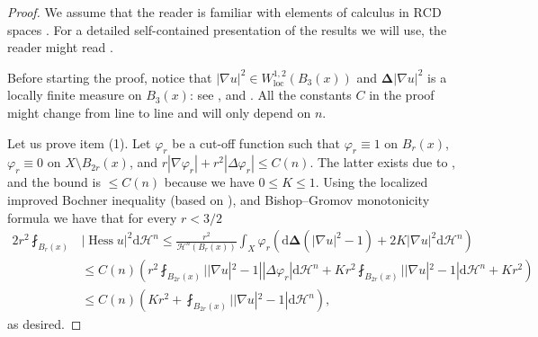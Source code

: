 \documentclass[12pt,a4paper,reqno]{amsart}
\renewcommand{\leq}{\leqslant}
\renewcommand{\d}{\ensuremath{\mathrm d}}
\newcommand{\Hess}{\operatorname{Hess}}
\begin{document}
\begin{proof}
 We assume that the reader is familiar with elements of calculus in $\mathrm{RCD}$ spaces \cite{GigliNDG}. For a detailed self-contained presentation of the results we will use, the reader might read \cite[Section 2]{GigliViolo}.

 Before starting the proof, notice that $|\nabla u|^2\in W^{1,2}_{\mathrm{loc}}(B_{3}(x))$ and $\mathbf{\Delta}|\nabla u|^2$ is a locally finite measure on $B_3(x)$: see \cite[Section 2.2.1]{GigliViolo}, and \cite[Corollary 3.3.9]{GigliNDG}. All the constants $C$ in the proof might change from line to line and will only depend on $n$.
 
 Let us prove item (1). Let $\varphi_r$ be a cut-off function such that $\varphi_r\equiv 1$ on $B_r(x)$, $\varphi_r\equiv 0$ on $X\setminus B_{2r}(x)$, and $r|\nabla\varphi_r|+r^2|\Delta\varphi_r|\leq C(n)$. The latter exists due to \cite[Lemma 3.1]{MondinoNaber}, and the bound is $\leq C(n)$ because we have $0\leq K\leq 1$. Using the localized improved Bochner inequality \cite[Proposition~2.14]{GigliViolo} (based on \cite[Theorem 3.3]{Bangxian}), and Bishop--Gromov monotonicity formula we have that for every $r<3/2$
    \[
    \begin{aligned}
    2r^2\fint_{B_r(x)}&|\Hess u|^2\d\mathcal{H}^n\leq \frac{r^2}{\mathcal{H}^n(B_r(x))}\int_{X} \varphi_r\left(\d\mathbf{\Delta}(|\nabla u|^2-1) +2K|\nabla u|^2\d\mathcal{H}^n\right)  \\
    &\leq C(n)\left(r^2\fint_{B_{2r}(x)}||\nabla u|^2-1||\Delta\varphi_r|\d\mathcal{H}^n + Kr^2\fint_{B_{2r}(x)}||\nabla u|^2-1|\d\mathcal{H}^n + Kr^2\right) \\
    &\leq C(n)\left(Kr^2 + \fint_{B_{2r}(x)}||\nabla u|^2-1|\d\mathcal{H}^n\right),
    \end{aligned}
    \]
    as desired. 
    

\end{proof}
\end{document}
